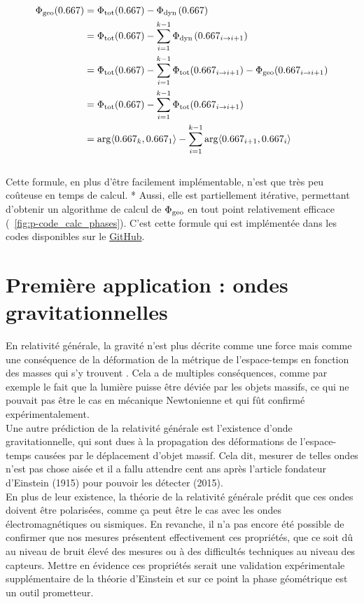 \par \noindent
\begin{align*}
	\phaseg(\x) &= \phaset(\x) - \phased(\x) \\
	&= \phaset(\x) - \sum_{i=1}^{k-1} \phased(\x_{i\rightarrow i+1}) \\
	&= \phaset(\x) - \sum_{i=1}^{k-1} \phaset(\x_{i\rightarrow i+1}) - \phaseg(\x_{i\rightarrow i+1}) \\
	&= \phaset(\x) - \sum_{i=1}^{k-1} \phaset(\x_{i\rightarrow i+1}) \\
	&= \arg\langle\x_k, \x_1\rangle - \sum_{i=1}^{k-1} \arg\langle\x_{i+1}, \x_i\rangle
\end{align*} 
\\
Cette formule, en plus d'être facilement implémentable, n'est que très peu coûteuse en temps de calcul. *
Aussi, elle est partiellement itérative, permettant d'obtenir un algorithme de calcul de $\Phi_{\text{\normalfont geo}}$ en tout point relativement efficace (\cf~\cref{fig:p-code_calc_phases}). 
C'est cette formule qui est implémentée dans les codes disponibles sur le \href{https://github.com/GregoireDoat/StageM2}{GitHub}.
\\



\section{Première application : ondes gravitationnelles} \label{subsec:ex-3D}

En relativité générale, la gravité n'est plus décrite comme une force mais comme une conséquence de la déformation de la métrique de l’espace-temps en fonction des masses qui s'y trouvent \cite{vankov_einsteins_nodate}.
Cela a de multiples conséquences, comme par exemple le fait que la lumière puisse être déviée par les objets massifs, ce qui ne pouvait pas être le cas en mécanique Newtonienne et qui fût confirmé expérimentalement.
\\
Une autre prédiction de la relativité générale est l'existence d'onde gravitationnelle, qui sont dues à la propagation des déformations de l’espace-temps causées par le déplacement d’objet massif.
Cela dit, mesurer de telles ondes n'est pas chose aisée et il a fallu attendre cent ans après l'article fondateur d'Einstein (1915) pour pouvoir les détecter (2015).
\\

En plus de leur existence, la théorie de la relativité générale prédit que ces ondes doivent être polarisées, comme ça peut être le cas avec les ondes électromagnétiques ou sismiques. En revanche, il n'a pas encore été possible de confirmer que nos mesures présentent effectivement ces propriétés, que ce soit dû au niveau de bruit élevé des mesures ou à des difficultés techniques au niveau des capteurs. Mettre en évidence ces propriétés serait une validation expérimentale supplémentaire de la théorie d'Einstein et sur ce point la phase géométrique est un outil prometteur.
\\

